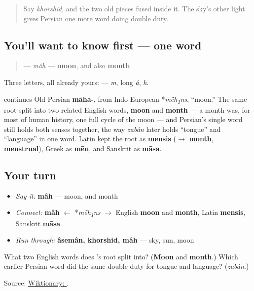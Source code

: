 \label{lesson:FA-C13-mah}



\begin{quote}
Say \emph{khorshid}, and the two old pieces fused inside it. The sky's other light gives Persian one more word doing double duty.
\end{quote}

\subsection*{You'll want to know first — one word}
\begin{quote}
\textbf{} — \emph{mâh} — \textbf{moon}, and also \textbf{month}
\end{quote}

Three letters, all already yours: \textbf{  } — \emph{m}, long \emph{â}, \emph{h}.

\begin{cousinweb}
\textbf{} continues Old Persian \textbf{māha-}, from Indo-European *\emph{m\'{\={e}}h\textsubscript{1}ns}, \textquotedblleft{}moon.\textquotedblright{} The same root split into two related English words, \textbf{moon} and \textbf{month} — a month was, for most of human history, one full cycle of the moon — and Persian's single word still holds both senses together, the way \emph{zabân} later holds \textquotedblleft{}tongue\textquotedblright{} and \textquotedblleft{}language\textquotedblright{} in one word. Latin kept the root as \textbf{mensis} ($\to$ \textbf{month}, \textbf{menstrual}), Greek as \textbf{mēn}, and Sanskrit as \textbf{māsa}.
\end{cousinweb}

\subsection*{Your turn}
\begin{itemize}
\raggedright
  \item \emph{Say it:} \textbf{mâh} — moon, and month
  \item \emph{Connect:} \textbf{mâh} $\leftarrow$ *\emph{m\'{\={e}}h\textsubscript{1}ns} $\to$ English \textbf{moon} and \textbf{month}, Latin \textbf{mensis}, Sanskrit \textbf{māsa}
  \item \emph{Run through:} \textbf{âsemân, khorshid, mâh} — sky, sun, moon
\end{itemize}

\begin{tcolorbox}[breakable,colback=teal!4,colframe=teal!35!black,title={Before you move on}]
What two English words does \textbf{}'s root split into? (\textbf{Moon} and \textbf{month}.) Which earlier Persian word did the same double duty for tongue and language? (\emph{zabân}.)

Source: \href{https://en.wiktionary.org/wiki/\%D9\%85\%D8\%A7\%D9\%87}{Wiktionary: }.
\end{tcolorbox}
